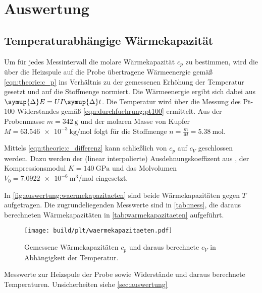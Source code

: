 \section{Auswertung}
\label{sec:auswertung}

\subsection{Temperaturabhängige Wärmekapazität}
Um für jedes Messintervall die molare Wärmekapazität $c_p$ zu bestimmen,
wird die über die Heizspule auf die Probe übertragene Wärmeenergie
gemäß \autoref{eqn:theorie:c_p}
ins Verhältnis zu der gemessenen Erhöhung der Temperatur gesetzt
und auf die Stoffmenge normiert.
Die Wärmeenergie ergibt sich dabei aus $\symup{\Delta}E = U I \symup{\Delta}t$.
Die Temperatur wird über die Messung des Pt-100-Widerstandes gemäß \autoref{eqn:durchfuehrung:pt100} ermittelt.
Aus der Probenmasse $m = \SI{342}{\gram}$ \cite{versuchsanleitung}
und der molaren Masse von Kupfer $M = \SI{63.546e-3}{\kilogram\per\mol}$ \cite{periodictable}
folgt für die Stoffmenge $n = \frac{m}{M} = \SI{5.38}{\mol}$.

Mittels \autoref{eqn:theorie:c_differenz} kann schließlich von $c_p$ auf $c_V$ geschlossen werden.
Dazu werden
der (linear interpolierte) Ausdehnungskoeffizent aus \cite[Tabelle 2]{versuchsanleitung},
der Kompressionsmodul $K = \SI{140}{\giga\pascal}$ \cite{periodictable} und
das Molvolumen $V_0 = \SI{7.0922e-6}{\cubic\meter\per\mol}$ \cite{periodictable} eingesetzt.

In \autoref{fig:auswertung:waermekapazitaeten} sind beide Wärmekapazitäten gegen $T$ aufgetragen.
Die zugrundeliegenden Messwerte sind in \autoref{tab:mess},
die daraus berechneten Wärmekapazitäten in \autoref{tab:warmekapazitaeten} aufgeführt.

\begin{figure}[H]
    \centering
    \texttt{[image: build/plt/waermekapazitaeten.pdf]}
    \caption{Gemessene Wärmekapazitäten $c_p$ und daraus berechnete $c_V$ in Abhängigkeit der Temperatur.}
    \label{fig:auswertung:waermekapazitaeten}
\end{figure}

\begin{table}
    \centering
    \caption{Messwerte zur Heizspule der Probe sowie Widerstände und daraus berechnete Temperaturen. Unsicherheiten siehe \autoref{sec:auswertung}}
    \label{tab:mess}
\end{table}

